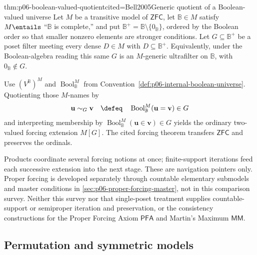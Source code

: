 \begin{hbtheorem}{thm:p06-boolean-valued-quotient}{cited=Bell2005}{Generic quotient of a Boolean-valued universe}
Let \(M\) be a transitive model of \(\mathsf{ZFC}\), let
\(\mathbb B\in M\) satisfy \(M\entails\) “\(\mathbb B\) is complete,” and
put \(\mathbb B^+=\mathbb B\setminus\{0_{\mathbb B}\}\), ordered by the
Boolean order so that smaller nonzero elements are stronger conditions.
Let \(G\subseteq\mathbb B^+\) be a poset filter meeting every dense
\(D\in M\) with \(D\subseteq\mathbb B^+\).  Equivalently, under the
Boolean-algebra reading this same \(G\) is an \(M\)-generic ultrafilter on
\(\mathbb B\), with \(0_{\mathbb B}\notin G\).

Use \((V^{\mathbb B})^M\) and
\(\operatorname{Bool}_{\mathbb B}^M\) from
Convention~\ref{def:p06-internal-boolean-universe}.  Quotienting those
\(M\)-names by
\[
  \mathbf u\sim_G\mathbf v
  \quad\defeq\quad
  \operatorname{Bool}_{\mathbb B}^M(\mathbf u=\mathbf v)\in G
\]
and interpreting membership by
\(\operatorname{Bool}_{\mathbb B}^M(\mathbf u\in\mathbf v)\in G\) yields the ordinary
two-valued forcing extension \(M[G]\).  The cited forcing theorem transfers
\(\mathsf{ZFC}\) and preserves the ordinals.
\end{hbtheorem}

Products coordinate several forcing notions at once; finite-support iterations
feed each successive extension into the next stage.  These are navigation
pointers only.  Proper forcing is developed separately through countable
elementary submodels and master conditions in
\cref{sec:p06-proper-forcing-master}, not in this comparison survey.
Neither this survey nor that single-poset treatment supplies countable-support
or semiproper iteration and preservation, or the consistency constructions
for the Proper Forcing Axiom \(\mathsf{PFA}\) and Martin's Maximum
\(\mathsf{MM}\).

\subsection{Permutation and symmetric models}

